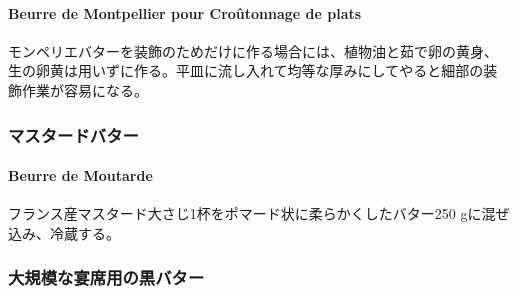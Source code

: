 \begin{recette}
\hypertarget{beurre-de-montpellier-pour-croutonnage-de-plats}{%
\paragraph{Beurre de Montpellier pour Croûtonnage de
plats}\label{beurre-de-montpellier-pour-croutonnage-de-plats}}


モンペリエバターを装飾のためだけに作る場合には、植物油と茹で卵の黄身、
生の卵黄は用いずに作る。平皿に流し入れて均等な厚みにしてやると細部の装
飾作業が容易になる。

\maeaki

\hypertarget{ux30deux30b9ux30bfux30fcux30c9ux30d0ux30bfux30fc}{%
\subsubsection{マスタードバター}\label{ux30deux30b9ux30bfux30fcux30c9ux30d0ux30bfux30fc}}

\hypertarget{beurre-de-moutarde}{%
\paragraph{Beurre de Moutarde}\label{beurre-de-moutarde}}


フランス産マスタード大さじ1\undemi{}杯をポマード状に柔らかくしたバター250
gに混ぜ込み、冷蔵する。

\maeaki

\hypertarget{ux5927ux898fux6a21ux306aux5bb4ux5e2dux7528ux306eux9ed2ux30d0ux30bfux30fc}{%
\subsubsection{大規模な宴席用の黒バター}\label{ux5927ux898fux6a21ux306aux5bb4ux5e2dux7528ux306eux9ed2ux30d0ux30bfux30fc}}


\end{recette}
